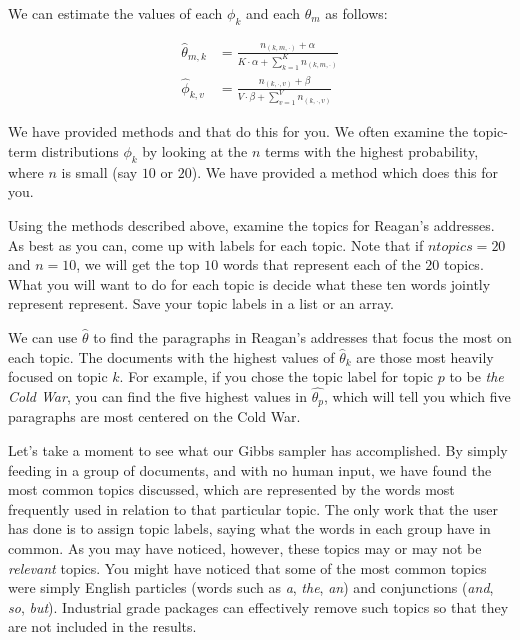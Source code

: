 We can estimate the values of each $\phi_{k}$ and each $\theta_{m}$ as follows:

\begin{align*}
\widehat{\theta}_{m,k} & = \frac{n_{(k,m,\cdot)} + \alpha}{K \cdot \alpha + \sum_{k=1}^{K} n_{(k,m,\cdot)}} \\
\widehat{\phi}_{k,v} & = \frac{n_{(k,\cdot,v)} + \beta}{V \cdot \beta + \sum_{v=1}^{V} n_{(k,\cdot,v)}}
\end{align*}

We have provided methods  and  that do this for you. We often examine the topic-term distributions $\phi_{k}$ by looking at the $n$ terms with the highest probability, where $n$ is small (say $10$ or $20$).  We have provided a method  which does this for you.

\begin{problem}
Using the methods described above, examine the topics for Reagan's addresses. As best as you can, come up with labels for each topic.  Note that if $ntopics=20$ and $n=10$, we will get the top $10$ words that represent each of the $20$ topics.  What you will want to do for each topic is decide what these ten words jointly represent represent.  Save your topic labels in a list or an array.
\end{problem}

We can use $\widehat{\theta}$ to find the paragraphs in Reagan's addresses that focus the most on each topic. The documents with the highest values of $\widehat{\theta}_{k}$ are those most heavily focused on topic $k$.  For example, if you chose the topic label for topic $p$ to be \emph{the Cold War}, you can find the five highest values in $\widehat{\theta_{p}}$, which will tell you which five paragraphs are most centered on the Cold War.
\begin{comment}
This problem was difficult for the first cohort, and since it does not add much to the lab it has been removed.

\begin{problem}
In your above topic analysis, you should have found a topic about the Cold War and one about education. Find the five paragraphs in Reagan's addresses that most closely focus on each of these topics, according to the above method.
\end{problem}
\end{comment}

Let's take a moment to see what our Gibbs sampler has accomplished.  By simply feeding in a group of documents, and with no human input, we have found the most common topics discussed, which are represented by the words most frequently used in relation to that particular topic.  The only work that the user has done is to assign topic labels, saying what the words in each group have in common.  As you may have noticed, however, these topics may or may not be \emph{relevant} topics.  You might have noticed that some of the most common topics were simply English particles (words such as \emph{a}, \emph{the}, \emph{an}) and conjunctions (\emph{and}, \emph{so}, \emph{but}).  Industrial grade packages can effectively remove such topics so that they are not included in the results.

